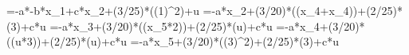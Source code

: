 =-a*-b*x_1+c*x_2+(3/25)*\sin((1)^2)+u
=-a*x_2+(3/20)*\sin((x_4+x_4))+(2/25)*\cos(3)+c*u
=-a*x_3+(3/20)*\sin((x_5*2))+(2/25)*\cos(u)+c*u
=-a*x_4+(3/20)*\sin((u*3))+(2/25)*\cos(u)+c*u
=-a*x_5+(3/20)*\sin((3)^2)+(2/25)*\cos(3)+c*u
